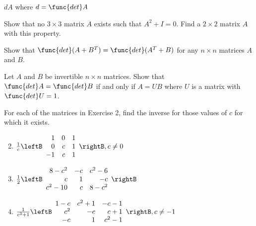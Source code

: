 \begin{multicols}{2}
\begin{ex}
\begin{sol}
$dA$ where $d = \func{det }A$
\end{sol}
\end{ex}

\begin{ex}
Show that no $3 \times 3$ matrix $A$ exists such that $A^{2} + I = 0$. Find a $2 \times 2$ matrix $A$ with this property.
\end{ex}

\begin{ex}
Show that $\func{det}(A + B^{T}) = \func{det}(A^{T} + B)$ for any $n \times n$ matrices $A$ and $B$.
\end{ex}

\begin{ex}
Let $A$ and $B$ be invertible $n \times n$ matrices. Show that $\func{det }A = \func{det }B$ if and only if $A = UB$ where $U$ is a matrix with $\func{det }U = 1$.
\end{ex}

\begin{ex}
For each of the matrices in Exercise 2, find the inverse for those values of $c$ for which it exists.

\begin{sol}
\begin{enumerate}[label={\alph*.}]
\setcounter{enumi}{1}
\item $\frac{1}{c} \leftB \begin{array}{rrr}
1 & 0 & 1 \\
0 & c & 1 \\
-1 & c & 1 
\end{array} \rightB, c \neq 0$

\setcounter{enumi}{3}
\item $\frac{1}{2}\leftB \begin{array}{rrr}
8-c^2 & -c & c^2-6 \\
c & 1 & -c \\
c^2-10 & c & 8-c^2 
\end{array} \rightB$


\setcounter{enumi}{5}
\item  $\frac{1}{c^3+1} \leftB \begin{array}{rrr}
1-c & c^2+1 & -c-1 \\
c^2 & -c & c+1 \\
-c & 1 & c^2-1 
\end{array} \rightB, c \neq -1$


\end{enumerate}
\end{sol}
\end{ex}


\end{multicols}
